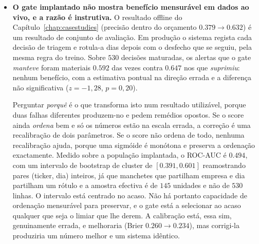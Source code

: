 \begin{itemize}
        de ter tendência (Secção~\ref{sec:cs_drift}). Os valores reportados devem portanto ler-se como
        medições sob uma dessas oscilações, e não como promessas sobre um período posterior.
  \item \textbf{O gate implantado não mostra benefício mensurável em dados ao vivo, e a razão é
        instrutiva.} O resultado offline do Capítulo~\ref{chap:casestudies} (precisão dentro do
        orçamento $0.379 \to 0.632$) é um resultado de conjunto de avaliação. Em produção o sistema
        regista cada decisão de triagem e rotula-a dias depois com o desfecho que se seguiu, pela
        mesma regra do treino. Sobre $530$ decisões maturadas, os alertas que o gate \emph{manteve}
        foram materiais $0.592$ das vezes contra $0.647$ nos que \emph{suprimiu}: nenhum benefício,
        com a estimativa pontual na direção errada e a diferença não significativa
        ($z = -1{,}28$, $p = 0{,}20$).

        Perguntar \emph{porquê} é o que transforma isto num resultado utilizável, porque duas
        falhas diferentes produzem-no e pedem remédios opostos. Se o score ainda \emph{ordena} bem e
        só os números estão na escala errada, a correção é uma recalibração de dois parâmetros. Se o
        score não ordena de todo, nenhuma recalibração ajuda, porque uma sigmóide é monótona e
        preserva a ordenação exactamente. Medido sobre a população implantada, o ROC-AUC é $0.494$,
        com um intervalo de bootstrap de cluster de $[0.391, 0.601]$ reamostrando pares
        (ticker, dia) inteiros, já que manchetes que partilham empresa e dia partilham um rótulo e a
        amostra efectiva é de $145$ unidades e não de $530$ linhas. O intervalo está centrado no
        acaso. Não há portanto capacidade de ordenação mensurável para preservar, e o gate está a
        selecionar ao acaso qualquer que seja o limiar que lhe derem. A calibração está, essa sim,
        genuinamente errada, e melhoraria (Brier $0.260 \to 0.234$), mas corrigi-la produziria um
        número melhor e um sistema idêntico.


\end{itemize}
